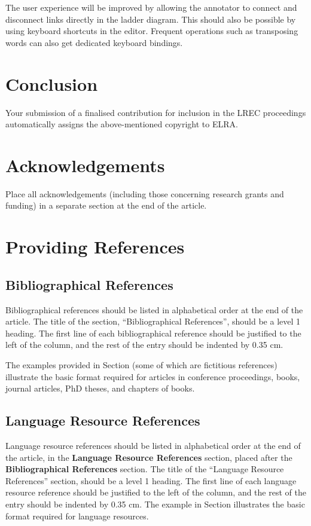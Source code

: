 \documentclass[10pt, a4paper]{article}
\newcommand{\secref}[1]{\StrSubstitute{\getrefnumber{#1}}{.}{ }}
\begin{document}
The user experience will be improved by allowing the annotator to connect
and disconnect links directly in the ladder diagram. This should also be
possible by using keyboard shortcuts in the editor.  Frequent operations
such as transposing words can also get dedicated keyboard bindings.

\section{Conclusion}

Your submission of a finalised contribution for inclusion in the LREC
proceedings automatically assigns the above-mentioned copyright to ELRA.

\section{Acknowledgements}

Place all acknowledgements (including those concerning research grants and
funding) in a separate section at the end of the article.

\section{Providing References}

\subsection{Bibliographical References}
Bibliographical references should be listed in alphabetical order at the
end of the article. The title of the section, ``Bibliographical References'',
should be a level 1 heading. The first line of each bibliographical reference
should be justified to the left of the column, and the rest of the entry should
be indented by 0.35 cm.

The examples provided in Section \secref{main:ref} (some of which are fictitious
references) illustrate the basic format required for articles in conference
proceedings, books, journal articles, PhD theses, and chapters of books.

\subsection{Language Resource References}

Language resource references should be listed in alphabetical order at the end
of the article, in the \textbf{Language Resource References} section, placed after
the \textbf{Bibliographical References} section. The title of the ``Language Resource
References'' section, should be a level 1 heading. The first line of each
language resource reference should be justified to the left of the column, and
the rest of the entry should be indented by 0.35 cm. The example in Section 
\secref{lr:ref} illustrates the basic format required for language resources.
\end{document}
